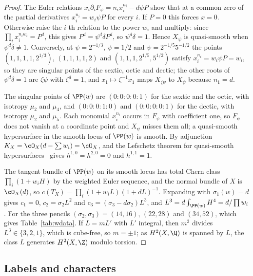 \begin{proof}
The Euler relations $x_i\partial_iF_\psi=n_ix_i^{n_i}-d\psi P$ show that at a
common zero of the partial derivatives $x_i^{n_i}=w_i\psi P$ for every $i$.
If $P=0$ this forces $x=0$. Otherwise raise the $i$-th relation to the power
$w_i$ and multiply: since $\prod_ix_i^{n_iw_i}=P^d$, this gives
$P^d=\psi^d\delta P^d$, so $\psi^d\delta=1$. Hence $X_\psi$ is quasi-smooth
when $\psi^d\delta\ne1$. Conversely, at $\psi=2^{-1/3}$, $\psi=1/2$ and
$\psi=2^{-1/5}5^{-1/2}$ the points $(1,1,1,1,2^{1/3})$, $(1,1,1,1,2)$ and
$(1,1,1,2^{1/5},5^{1/2})$ satisfy $x_i^{n_i}=w_i\psi P=w_i$, so they are
singular points of the sextic, octic and dectic; the other roots of
$\psi^d\delta=1$ are $\zeta\psi$ with $\zeta^d=1$, and
$x_1\mapsto\zeta^{-1}x_1$ maps $X_{\zeta\psi}$ to $X_\psi$ because $n_1=d$.

The singular points of $\PP(w)$ are $(0{:}0{:}0{:}0{:}1)$ for the sextic
and the octic, with isotropy $\mu_2$ and $\mu_4$, and $(0{:}0{:}0{:}1{:}0)$
and $(0{:}0{:}0{:}0{:}1)$ for the dectic, with isotropy $\mu_2$ and $\mu_5$.
Each monomial $x_i^{n_i}$ occurs in $F_\psi$ with coefficient one, so $F_\psi$
does not vanish at a coordinate point and $X_\psi$ misses them all; a
quasi-smooth hypersurface in the smooth locus of $\PP(w)$ is smooth. By
adjunction $K_X=\cO_X(d-\sum w_i)=\cO_X$, and the Lefschetz theorem for
quasi-smooth hypersurfaces~\cite{Dol82} gives $h^{1,0}=h^{2,0}=0$ and
$h^{1,1}=1$.

The tangent bundle of $\PP(w)$ on its smooth locus has total Chern class
$\prod_i(1+w_iH)$ by the weighted Euler sequence, and the normal bundle of
$X$ is $\cO_X(d)$, so $c(T_X)=\prod_i(1+w_iL)(1+dL)^{-1}$. Expanding with
$\sigma_1(w)=d$ gives $c_1=0$, $c_2=\sigma_2L^2$ and
$c_3=(\sigma_3-d\sigma_2)L^3$, and $L^3=d\int_{\PP(w)}H^4=d/\prod w_i$. For
the three pencils $(\sigma_2,\sigma_3)=(14,16)$, $(22,28)$ and $(34,52)$,
which gives Table~\ref{tab:wdata}. If $L=mL'$ with $L'$ integral, then
$m^3$ divides $L^3\in\{3,2,1\}$, which is cube-free, so $m=\pm1$; as
$H^2(X,\Q)$ is spanned by $L$, the class $L$ generates $H^2(X,\Z)$ modulo
torsion.
\end{proof}

\subsection{Labels and characters}

